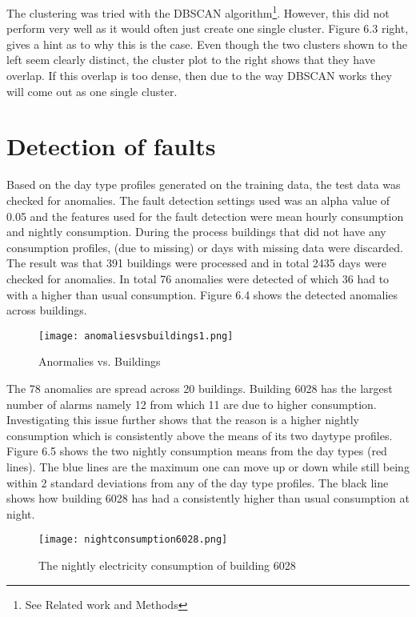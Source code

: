 The clustering was tried with the DBSCAN algorithm\footnote{See Related work and Methods}. However, this did not perform very well as it would often just create one single cluster. Figure 6.3 right, gives a hint as to why this is the case. Even though the two clusters shown to the left seem clearly distinct, the cluster plot to the right shows that they have overlap. If this overlap is too dense, then due to the way DBSCAN works they will come out as one single cluster.

\section*{Detection of faults}
Based on the day type profiles generated on the training data, the test data was checked for anomalies. The fault detection settings used was an alpha value of 0.05 and the features used for the fault detection were mean hourly consumption and nightly consumption. During the process buildings that did not have any consumption profiles, (due to missing) or days with missing data were discarded. The result was that 391 buildings were processed and in total 2435 days were checked for anomalies. In total 76 anomalies were detected of which 36 had to with a higher than usual consumption. Figure 6.4 shows the detected anomalies across buildings.
\begin{figure}
\begin{center}
\texttt{[image: anomaliesvsbuildings1.png]}
\end{center}
\caption{Anormalies vs. Buildings}
\end{figure}

The 78 anomalies are spread across 20 buildings. Building 6028 has the largest number of alarms namely 12 from which 11 are due to higher consumption. Investigating this issue further shows that the reason is a higher nightly consumption which is consistently above the means of its two daytype profiles. Figure 6.5 shows the two nightly consumption means from the day types (red lines). The blue lines are the maximum one can move up or down while still being within 2 standard deviations from any of the day type profiles. The black line shows how building 6028 has had a consistently higher than usual consumption at night.
\begin{figure}
\begin{center}
\texttt{[image: nightconsumption6028.png]}
\end{center}
\caption{The nightly electricity consumption of building 6028}
\end{figure}

